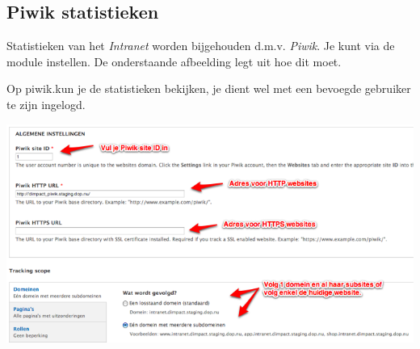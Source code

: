 \subsection{Piwik statistieken}\label{piwikstatistieken}
Statistieken van het \emph{Intranet} worden bijgehouden d.m.v. \emph{Piwik}. 
Je kunt via  de module instellen. De onderstaande afbeelding legt uit hoe dit moet. 

Op piwik.\drupalpath kun je de statistieken bekijken, je dient wel met een bevoegde gebruiker te zijn ingelogd. 

\begin{center}
	\includegraphics[width=\textwidth]{img/piwik.png}
\end{center}